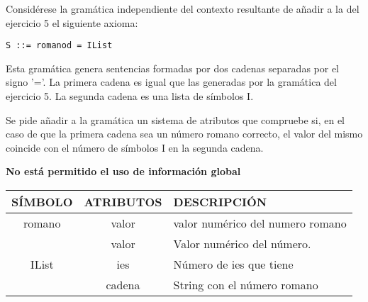 \documentclass[nochap]{apuntes}
\begin{document}
\begin{problem}
Considérese la gramática independiente del contexto resultante de añadir a la del ejercicio 5 el siguiente axioma:
\begin{verbatim}
S ::= romanod = IList
\end{verbatim}
Esta gramática genera sentencias formadas por dos cadenas separadas por el signo '='. La primera cadena es igual que las generadas por la gramática del ejercicio 5. La segunda cadena es una lista de símbolos I.

Se pide añadir a la gramática un sistema de atributos que compruebe si, en el caso de que la primera cadena sea un número romano correcto, el valor del mismo coincide con el número de símbolos I en la segunda cadena.

\textbf{No está permitido el uso de información global}
\solution
\begin{tabular}{|c|c|l|}
\hline
SÍMBOLO & ATRIBUTOS & DESCRIPCIÓN \\
\hline
romano & valor & valor numérico del numero romano\\
\hline
 & valor & Valor numérico del número. \\
\cline{2-3}
IList & ies & Número de ies que tiene \\
\cline{2-3}
 & cadena & String con el número romano \\
\hline
 
\end{tabular}


\end{problem}
\end{document}
